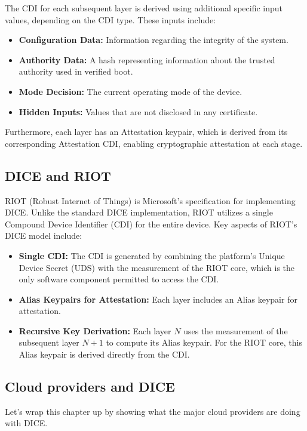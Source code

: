 The CDI for each subsequent layer is derived using additional specific
input values, depending on the CDI type. These inputs include:
\begin{itemize}
    \item \textbf{Configuration Data:} Information regarding the
    integrity of the system.
    \item \textbf{Authority Data:} A hash representing information
    about the trusted authority used in verified boot.
    \item \textbf{Mode Decision:} The current operating mode of the
    device.
    \item \textbf{Hidden Inputs:} Values that are not disclosed in
    any certificate.
\end{itemize}

Furthermore, each layer has an Attestation keypair, which is derived
from its corresponding Attestation CDI, enabling cryptographic
attestation at each stage.

\subsection{DICE and RIOT}

RIOT (Robust Internet of Things) is Microsoft's specification for
implementing DICE. Unlike the standard DICE implementation, RIOT
utilizes a single Compound Device Identifier (CDI) for the entire
device. Key aspects of RIOT's DICE model include:

\begin{itemize}
    \item \textbf{Single CDI:} The CDI is generated by combining the
    platform's Unique Device Secret (UDS) with the measurement of the
    RIOT core, which is the only software component permitted to
    access the CDI.
    \item \textbf{Alias Keypairs for Attestation:} Each layer
    includes an Alias keypair for attestation.
    \item \textbf{Recursive Key Derivation:} Each layer \(N\) uses
    the measurement of the subsequent layer \(N+1\) to compute its
    Alias keypair. For the RIOT core, this Alias keypair is derived
    directly from the CDI.
\end{itemize}

\subsection{Cloud providers and DICE}
Let's wrap this chapter up by showing what the major cloud providers 
are doing with DICE.

